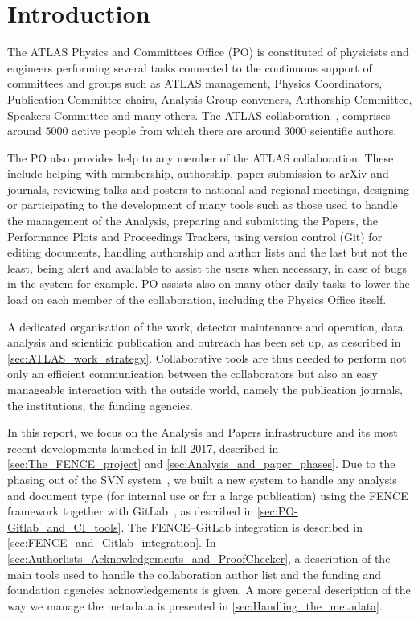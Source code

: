 
\section{Introduction}%
\label{sec:Introduction}

The ATLAS Physics and Committees Office (PO) is constituted of physicists and engineers performing several tasks connected to the continuous support of committees and groups such as ATLAS management, Physics Coordinators, Publication Committee chairs, Analysis Group conveners, Authorship Committee, Speakers
Committee and many others. The ATLAS collaboration~\cite{PERF-2007-01}, comprises around 5000 active people from which there are around 3000 scientific authors.

The PO also provides help to any member of the ATLAS collaboration. These include helping with membership, authorship, paper submission to arXiv and journals, reviewing talks and posters to national and regional meetings, designing or participating to the development of many tools such as those used to handle the management of the Analysis, preparing and submitting the Papers, the Performance Plots and Proceedings Trackers, using version control (Git) for editing documents, handling authorship and  author lists and the last but not the least, being alert  and available to assist the users when necessary, in case of bugs in the system for example. PO assists also on many other daily tasks to lower the load on each member of the collaboration, including the Physics Office itself.

A dedicated organisation of the work, detector maintenance and operation, data analysis and scientific publication and outreach has been set up, as described in \cref{sec:ATLAS_work_strategy}.
Collaborative tools are thus needed to perform not only an efficient communication between the collaborators but also an easy manageable interaction with the outside world, namely the publication journals, the institutions, the funding agencies.

In this report, we focus on the Analysis and Papers infrastructure and its most recent developments launched in fall 2017, described in \cref{sec:The_FENCE_project} and \cref{sec:Analysis_and_paper_phases}.
Due to the phasing out of the SVN system~\cite{svn}, we built a new system to handle any analysis and document type (for internal use or for a large publication) using the FENCE framework  together with GitLab~\cite{gitlab}, as described in \cref{sec:PO-Gitlab_and_CI_tools}.
The FENCE--GitLab integration is described in \cref{sec:FENCE_and_Gitlab_integration}. In \cref{sec:Authorlists_Acknowledgements_and_ProofChecker}, a description of the main tools used to handle the collaboration author list and the funding and foundation agencies acknowledgements is given.
A more general description of the way we manage the metadata is presented in \cref{sec:Handling_the_metadata}.
